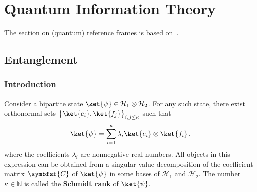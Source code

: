 \chapter{Quantum Information Theory}\label{chapter:quantum_computing}

    The section on (quantum) reference frames is based on~\citet{de_la_hamette_quantum_2020}.

    \minitoc

\section{Entanglement}
\subsection{Introduction}

    \begin{construct}
        Consider a bipartite state $\ket{\psi}\in\mathcal{H}_1\otimes\mathcal{H}_2$. For any such state, there exist orthonormal sets $\bigl\{\ket{e_i},\ket{f_j}\bigr\}_{i,j\leq\kappa}$ such that
        \begin{gather}
            \ket{\psi} = \sum_{i=1}^\kappa\lambda_i\ket{e_i}\otimes\ket{f_i}\,,
        \end{gather}
        where the coefficients $\lambda_i$ are nonnegative real numbers. All objects in this expression can be obtained from a singular value decomposition of the coefficient matrix $\symbfsf{C}$ of $\ket{\psi}$ in some bases of $\mathcal{H}_1$ and $\mathcal{H}_2$. The number $\kappa\in\mathbb{N}$ is called the \textbf{Schmidt rank} of $\ket{\psi}$.
    \end{construct}


